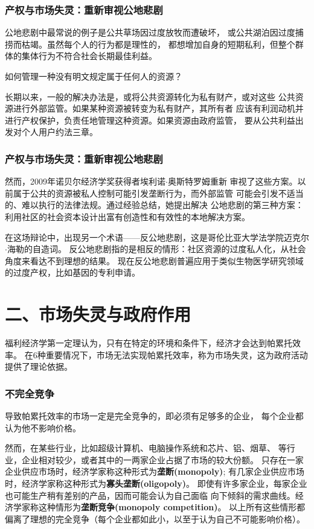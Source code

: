 \documentclass[aspectratio=169, 12pt]{beamer}
\begin{document}
\begin{frame}[plain]
    \frametitle{产权与市场失灵：重新审视公地悲剧}
    公地悲剧中最常说的例子是公共草场因过度放牧而遭破坏，
    或公共湖泊因过度捕捞而枯竭。虽然每个人的行为都是理性的，
    都想增加自身的短期私利，但整个群体的集体行为不符合社会长期最佳利益。
    \par
    如何管理一种没有明文规定属于任何人的资源？
    \par
    长期以来，一般的解决办法是，或将公共资源转化为私有财产，或对这些
    公共资源进行外部监管。如果某种资源被转变为私有财产，其所有者
    应该有利润动机并进行产权保护，负责任地管理这种资源。如果资源由政府监管，
    要从公共利益出发对个人用户约法三章。
\end{frame}

\begin{frame}[plain]
    \frametitle{产权与市场失灵：重新审视公地悲剧}
    然而，2009年诺贝尔经济学奖获得者埃利诺$\cdot $奥斯特罗姆重新
    审视了这些方案。以前属于公共的资源被私人控制可能引发垄断行为，而外部监管
    可能会引发不适当的、难以执行的法律法规。通过经验总结，她提出解决
    公地悲剧的第三种方案：利用社区的社会资本设计出富有创造性和有效性的本地解决方案。
    \par
    在这场辩论中，出现另一个术语——反公地悲剧，这是哥伦比亚大学法学院迈克尔$\cdot $海勒的自造词。
    反公地悲剧指的是相反的情形：社区资源的过度私人化，从社会角度来看达不到理想的结果。
    现在反公地悲剧普遍应用于类似生物医学研究领域的过度产权，比如基因的专利申请。
\end{frame}

\section{二、市场失灵与政府作用}

\begin{frame}[plain]
    福利经济学第一定理认为，只有在特定的环境和条件下，经济才会达到帕累托效率。
    在6种重要情况下，市场无法实现帕累托效率，称为市场失灵，这为政府活动提供了理论依据。
\end{frame}

\begin{frame}[plain]
    \frametitle{不完全竞争}
    导致帕累托效率的市场一定是完全竞争的，即必须有足够多的企业，
    每个企业都认为他不影响价格。
    \par
    然而，在某些行业，比如超级计算机、电脑操作系统和芯片、铝、烟草、
    等行业，企业相对较少，或者其中的一两家企业占据了市场的较大份额。
    只存在一家企业供应市场时，经济学家称这种形式为\textbf{垄断(monopoly)};
    有几家企业供应市场时，经济学家称这种形式为\textbf{寡头垄断(oligopoly)}。
    即使有许多家企业，每家企业也可能生产稍有差别的产品，因而可能会认为自己面临
    向下倾斜的需求曲线。经济学家称这种情形为\textbf{垄断竞争(monopoly competition)}。
    以上所有这些情形都偏离了理想的完全竞争（每个企业都如此小，以至于认为自己不可能影响价格）。
\end{frame}
\end{document}
